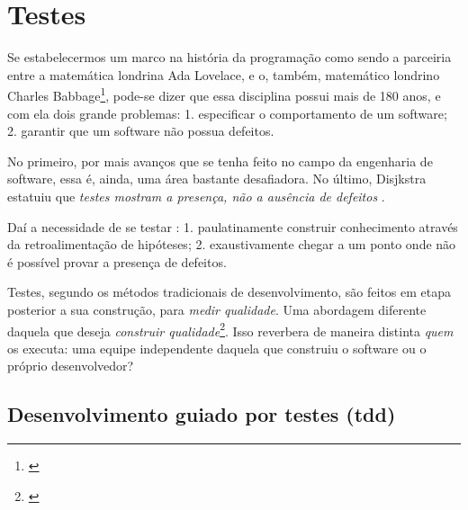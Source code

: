 


  
  
  




  \clearpage

  \thispagestyle{empty}

  

  

  

  \section{Testes}

    Se estabelecermos um marco na história da programação como sendo a parceiria entre a matemática londrina Ada Lovelace, e o, também, matemático londrino Charles Babbage\footnote{\cite{Huskey1980}}, pode-se dizer que essa disciplina possui mais de 180 anos, e com ela dois grande problemas: 1. especificar o comportamento de um software; 2. garantir que um software não possua defeitos.

    No primeiro, por mais avanços que se tenha feito no campo da engenharia de software, essa é, ainda, uma área bastante desafiadora. No último, Disjkstra estatuiu que \emph{testes mostram a presença, não a ausência de defeitos} \cite[pág. 16]{Nato1969}.

    Daí a necessidade de se testar \cite[pág. xxix-xxx]{Mezaros2007}: 1. paulatinamente construir conhecimento através da retroalimentação de hipóteses; 2. exaustivamente chegar a um ponto onde não é possível provar a presença de defeitos.

    Testes, segundo os métodos tradicionais de desenvolvimento, são feitos em etapa posterior a sua construção, para \emph{medir qualidade}. Uma abordagem diferente daquela que deseja \emph{construir qualidade}\footnote{ \cite[pág. 7]{FarcicGarcia2015}}. Isso reverbera de maneira distinta \emph{quem} os executa: uma equipe independente daquela que construiu o software ou o próprio desenvolvedor?

    \subsection{Desenvolvimento guiado por testes (tdd)}

